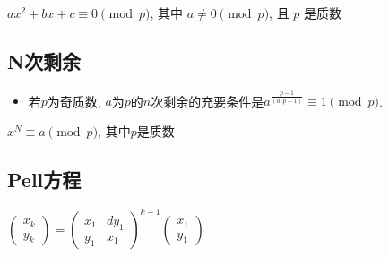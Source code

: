 \documentclass[landscape, twocolumn, 8pt, a4paper, twoside]{extarticle}
\begin{document}
\begin{spacing}{0.1}
$ax^2 + bx + c \equiv 0 \pmod{p}$, 其中 $a \ne 0 \pmod{p}$, 且 $p$ 是质数


\subsection{N次剩余}
\begin{itemize}
\item 若$p$为奇质数, $a$为$p$的$n$次剩余的充要条件是$a^{\frac{p - 1}{(a, p - 1)}} \equiv 1 \pmod{p}$.
\end{itemize}
$x^N \equiv a \pmod{p}$, 其中$p$是质数


\subsection{Pell方程}
$\begin{pmatrix}
  x_k \\ y_k
\end{pmatrix} = 
\begin{pmatrix}
  x_1 & dy_1 \\
  y_1 & x_1
\end{pmatrix} ^ {k - 1}
\begin{pmatrix}
  x_1 \\ y_1
\end{pmatrix}
$




\end{spacing}
\end{document}
